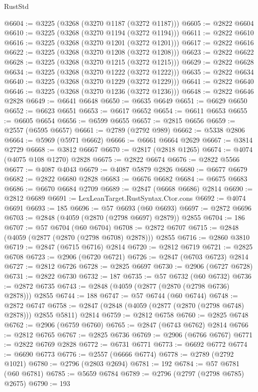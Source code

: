 \begin{lexlean}{RustStd}
\begin{coremodule}
@6604 := @3225 (@3268 (@3270 @1187 (@3272 @1187)))
@6605 := @2822 @6604
@6610 := @3225 (@3268 (@3270 @1194 (@3272 @1194)))
@6611 := @2822 @6610
@6616 := @3225 (@3268 (@3270 @1201 (@3272 @1201)))
@6617 := @2822 @6616
@6622 := @3225 (@3268 (@3270 @1208 (@3272 @1208)))
@6623 := @2822 @6622
@6628 := @3225 (@3268 (@3270 @1215 (@3272 @1215)))
@6629 := @2822 @6628
@6634 := @3225 (@3268 (@3270 @1222 (@3272 @1222)))
@6635 := @2822 @6634
@6640 := @3225 (@3268 (@3270 @1229 (@3272 @1229)))
@6641 := @2822 @6640
@6646 := @3225 (@3268 (@3270 @1236 (@3272 @1236)))
@6648 := @2822 @6646 @2828
@6649 := @6641 @6648
@6650 := @6635 @6649
@6651 := @6629 @6650
@6652 := @6623 @6651
@6653 := @6617 @6652
@6654 := @6611 @6653
@6655 := @6605 @6654
@6656 := @6599 @6655
@6657 := @2815 @6656
@6659 := @2557 (@6595 @6657)
@6661 := @2789 (@2792 @989)
@6662 := @5338 @2806
@6664 := @5969 (@5971 @6662)
@6666 := @6661 @6664 @2629
@6667 := @3814 @2729
@6668 := @3812 @6667
@6670 := @2817 (@2818 @1265)
@6674 := @4074 (@4075 @108 @1270) @2828
@6675 := @2822 @6674
@6676 := @2822 @5566
@6677 := @4087 @4043
@6679 := @4087 @5879 @2826
@6680 := @6677 @6679
@6682 := @2822 @6680 @2828
@6683 := @6676 @6682
@6684 := @6675 @6683
@6686 := @6670 @6684 @2709
@6689 := @2847 (@6668 @6686) @2814
@6690 := @2812 @6689
@6691 := LexLeanTarget.RustSyntax.Ctor.cons
@6692 := @4074 @6691
@6693 := 185
@6696 := @57 @6693 (@60 @6693)
@6697 := @2872 @6696
@6703 := @2848 (@4059 (@2870 (@2798 @6697) @2879)) @2855
@6704 := 186
@6707 := @57 @6704 (@60 @6704)
@6708 := @2872 @6707
@6715 := @2848 (@4059 (@2877 (@2870 (@2798 @6708) @2878))) @2855
@6716 := @2860 @3810
@6719 := @2847 (@6715 @6716) @2814
@6720 := @2812 @6719
@6721 := @2825 @6708
@6723 := @2906 (@6720 @6721)
@6726 := @2847 (@6703 @6723) @2814
@6727 := @2812 @6726
@6728 := @2825 @6697
@6730 := @2906 (@6727 @6728)
@6731 := @2822 @6730
@6732 := 187
@6735 := @57 @6732 (@60 @6732)
@6736 := @2872 @6735
@6743 := @2848 (@4059 (@2877 (@2870 (@2798 @6736) @2878))) @2855
@6744 := 188
@6747 := @57 @6744 (@60 @6744)
@6748 := @2872 @6747
@6758 := @2847 (@2848 (@4059 (@2877 (@2870 (@2798 @6748) @2878))) @2855 @5811) @2814
@6759 := @2812 @6758
@6760 := @2825 @6748
@6762 := @2906 (@6759 @6760)
@6765 := @2847 (@6743 @6762) @2814
@6766 := @2812 @6765
@6767 := @2825 @6736
@6769 := @2906 (@6766 @6767)
@6771 := @2822 @6769 @2828
@6772 := @6731 @6771
@6773 := @6692 @6772
@6774 := @6690 @6773
@6776 := @2557 (@6666 @6774)
@6778 := @2789 (@2792 @1021)
@6780 := @2796 (@2803 @2694)
@6781 := 192
@6784 := @57 @6781 (@60 @6781)
@6785 := @5659 @6784
@6789 := @2796 (@2797 (@2798 @6785) @2675)
@6790 := 193

\end{coremodule}
\end{lexlean}
